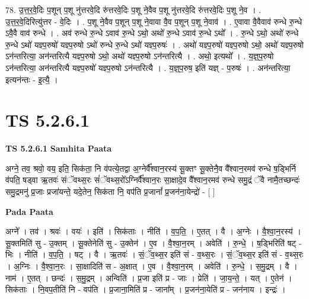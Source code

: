 \documentclass[17pt]{extarticle}
\begin{document}
78. उ॒त्त॒र॒वे॒दिः प॒शून् प॒शू नु॑त्तरवे॒दि रु॑त्तरवे॒दिः प॒शू ने॒वैव प॒शू नु॑त्तरवे॒दि रु॑त्तरवे॒दिः प॒शू ने॒व । . उ॒त्त॒र॒वे॒दिरित्यु॑त्तर - वे॒दिः । . प॒शू ने॒वैव प॒शून् प॒शू ने॒वावा वै॒व प॒शून् प॒शू ने॒वाव॑ । . ए॒वावा वै॒वैवाव॑ रुन्धे रु॒न्धे ऽवै॒वै वाव॑ रुन्धे । . अव॑ रुन्धे रु॒न्धे ऽवाव॑ रु॒न्धे ऽथो॒ अथो॑ रु॒न्धे ऽवाव॑ रु॒न्धे ऽथो᳚ । . रु॒न्धे ऽथो॒ अथो॑ रुन्धे रु॒न्धे ऽथो॑ यज्ञ्प॒रुषो॑ यज्ञ्प॒रुषो ऽथो॑ रुन्धे रु॒न्धे ऽथो॑ यज्ञ्प॒रुषः॑ । . अथो॑ यज्ञ्प॒रुषो॑ यज्ञ्प॒रुषो ऽथो॒ अथो॑ यज्ञ्प॒रुषो ऽन॑न्तरित्या॒ अन॑न्तरित्यै यज्ञ्प॒रुषो ऽथो॒ अथो॑ यज्ञ्प॒रुषो ऽन॑न्तरित्यै । . अथो॒ इत्यथो᳚ । . य॒ज्ञ्॒प॒रुषो ऽन॑न्तरित्या॒ अन॑न्तरित्यै यज्ञ्प॒रुषो॑ यज्ञ्प॒रुषो ऽन॑न्तरित्यै । . य॒ज्ञ्॒प॒रुष॒ इति॑ यज्ञ् - प॒रुषः॑ । . अन॑न्तरित्या॒ इत्यन॑न्तः - इ॒त्यै॒ । \newline
\pagebreak
{}

\section{ TS 5.2.6.1 }

\textbf{TS 5.2.6.1 } \newline
\textbf{Samhita Paata} \newline

अग्ने॒ तव॒ श्रवो॒ वय॒ इति॒ सिक॑ता॒ नि व॑पत्ये॒तद्वा अ॒ग्नेर्वै᳚श्वान॒रस्य॑ सू॒क्तꣳ सू॒क्तेनै॒व वै᳚श्वान॒रमव॑ रुन्धे ष॒ड्भिर्नि व॑पति॒ षड्वा ऋ॒तवः॑ संॅवथ्स॒रः सं॑ॅवथ्स॒रो᳚ऽग्निर्वै᳚श्वान॒रः सा॒क्षादे॒व वै᳚श्वान॒रमव॑ रुन्धे समु॒द्रं ॅवै नामै॒तच्छन्दः॑ समु॒द्रमनु॑ प्र॒जाः प्रजा॑यन्ते॒ यदे॒तेन॒ सिक॑ता नि॒ वप॑ति प्र॒जानां᳚ प्र॒जन॑ना॒येन्द्रो॑ - [  ] \newline

\textbf{Pada Paata} \newline

अग्ने᳚ । तव॑ । श्रवः॑ । वयः॑ । इति॑ । सिक॑ताः । नीति॑ । व॒प॒ति॒ । ए॒तत् । वै । अ॒ग्नेः । वै॒श्वा॒न॒रस्य॑ । सू॒क्तमिति॑ सु - उ॒क्तम् । सू॒क्तेनेति॑ सु - उ॒क्तेन॑ । ए॒व । वै॒श्वा॒न॒रम् । अवेति॑ । रु॒न्धे॒ । ष॒ड्भिरिति॑ षट् - भिः । नीति॑ । व॒प॒ति॒ । षट् । वै । ऋ॒तवः॑ । सं॒ॅव॒थ्स॒र इति॑ सं - व॒थ्स॒रः । सं॒ॅव॒थ्स॒र इति॑ सं - व॒थ्स॒रः । अ॒ग्निः । वै॒श्वा॒न॒रः । सा॒क्षादिति॑ स - अ॒क्षात् । ए॒व । वै॒श्वा॒न॒रम् । अवेति॑ । रु॒न्धे॒ । स॒मु॒द्रम् । वै । नाम॑ । ए॒तत् । छन्दः॑ । स॒मु॒द्रम् । अन्विति॑ । प्र॒जा इति॑ प्र - जाः । प्रेति॑ । जा॒य॒न्ते॒ । यत् । ए॒तेन॑ । सिक॑ताः । नि॒वप॒तीति॑ नि - वप॑ति । प्र॒जाना॒मिति॑ प्र - जाना᳚म् । प्र॒जन॑ना॒येति॑ प्र - जन॑नाय । इन्द्रः॑ ।  \newline
\end{document}
